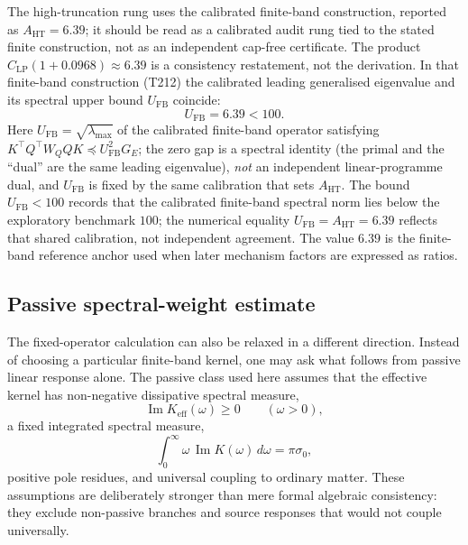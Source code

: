 \documentclass[11pt,a4paper]{article}
\begin{document}
The high-truncation rung uses the calibrated finite-band construction, reported as $A_{\mathrm{HT}}=6.39$; it should be read as a calibrated audit rung tied to the stated finite construction, not as an independent cap-free certificate. The product $C_{\mathrm{LP}}(1+0.0968)\approx6.39$ is a consistency restatement, not the derivation. In that finite-band construction (T212) the calibrated leading generalised eigenvalue and its spectral upper bound $U_{\mathrm{FB}}$ coincide:
\[
U_{\mathrm{FB}} = 6.39 < 100.
\]
Here $U_{\mathrm{FB}}=\sqrt{\lambda_{\max}}$ of the calibrated finite-band operator satisfying $K^{\top}Q^{\top}W_{Q}QK\preceq U_{\mathrm{FB}}^{2}G_{E}$; the zero gap is a spectral identity (the primal and the ``dual'' are the same leading eigenvalue), \emph{not} an independent linear-programme dual, and $U_{\mathrm{FB}}$ is fixed by the same calibration that sets $A_{\mathrm{HT}}$. The bound $U_{\mathrm{FB}}<100$ records that the calibrated finite-band spectral norm lies below the exploratory benchmark $100$; the numerical equality $U_{\mathrm{FB}}=A_{\mathrm{HT}}=6.39$ reflects that shared calibration, not independent agreement. The value $6.39$ is the finite-band reference anchor used when later mechanism factors are expressed as ratios.

\subsection{Passive spectral-weight estimate}

The fixed-operator calculation can also be relaxed in a different direction. Instead of choosing a particular finite-band kernel, one may ask what follows from passive linear response alone. The passive class used here assumes that the effective kernel has non-negative dissipative spectral measure,
\[
\operatorname{Im}K_{\mathrm{eff}}(\omega)\geq0
\qquad
(\omega>0),
\]
a fixed integrated spectral measure,
\[
\int_{0}^{\infty} \omega\,\operatorname{Im}K(\omega)\,d\omega = \pi\sigma_{0},
\]
positive pole residues, and universal coupling to ordinary matter. These assumptions are deliberately stronger than mere formal algebraic consistency: they exclude non-passive branches and source responses that would not couple universally.
\end{document}
